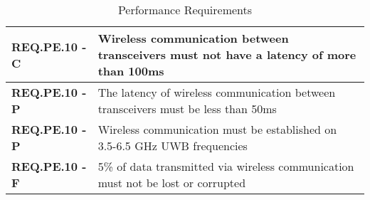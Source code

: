 \documentclass[11pt]{article}
\begin{document}
\begin{table}[H]
\begin{tabular}{ | m{3.5cm} | m{12.5cm} | }
\hline
 \textbf{ REQ.PE.10 - C } & Wireless communication between transceivers must not have a latency of more than 100ms \\
\hline
 \textbf{ REQ.PE.10 - P } & The latency of wireless communication between transceivers must be less than 50ms \\
\hline
 \textbf{ REQ.PE.10 - P } & Wireless communication must be established on 3.5-6.5 GHz UWB frequencies \\
\hline
 \textbf{ REQ.PE.10 - F } & 5\% of data transmitted via wireless communication must not be lost or corrupted \\
\hline

\end{tabular}
\caption{Performance Requirements}
\end{table}	


	
\end{document}
